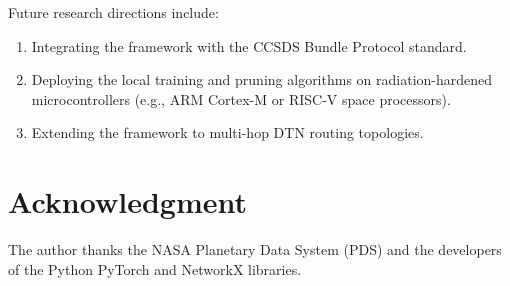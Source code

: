 \documentclass[journal,twocolumn]{IEEEtran}
\begin{document}
Future research directions include:
\begin{enumerate}
    \item Integrating the framework with the CCSDS Bundle Protocol standard.
    \item Deploying the local training and pruning algorithms on radiation-hardened microcontrollers (e.g., ARM Cortex-M or RISC-V space processors).
    \item Extending the framework to multi-hop DTN routing topologies.
\end{enumerate}

\section*{Acknowledgment}
The author thanks the NASA Planetary Data System (PDS) and the developers of the Python PyTorch and NetworkX libraries.

\balance


\end{document}
